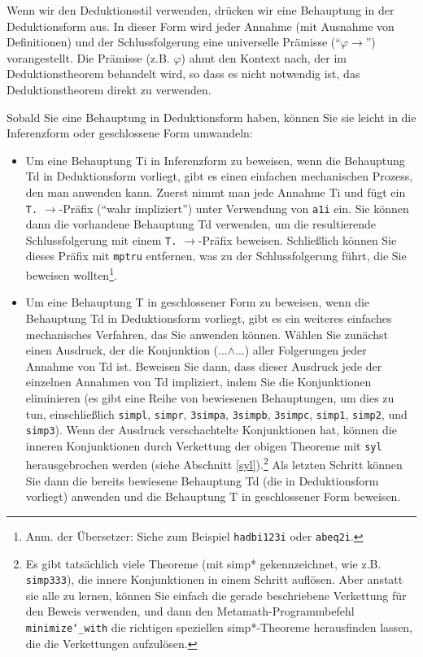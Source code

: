 Wenn wir den Deduktionsstil verwenden, drücken wir eine Behauptung in der Deduktionsform aus. In dieser Form wird jeder Annahme (mit Ausnahme von Definitionen) und der Schlussfolgerung eine universelle Prämisse ("`$\varphi \rightarrow$"') vorangestellt. Die Prämisse (z.B. $\varphi$) ahmt den Kontext nach, der im Deduktionstheorem behandelt wird, so dass es nicht notwendig ist, das Deduktionstheorem direkt zu verwenden.

Sobald Sie eine Behauptung in Deduktionsform haben, können Sie sie leicht in die Inferenzform oder geschlossene Form umwandeln:

\begin{itemize}
\item Um eine Behauptung Ti in Inferenzform zu beweisen, wenn die Behauptung Td in Deduktionsform vorliegt, gibt es einen einfachen mechanischen Prozess, den man anwenden kann. Zuerst nimmt man jede Annahme Ti und fügt ein \texttt{T.} $\rightarrow$-Präfix ("`wahr impliziert"') unter Verwendung von \texttt{a1i} ein. Sie können dann die vorhandene Behauptung Td verwenden, um die resultierende Schlussfolgerung mit einem \texttt{T.} $\rightarrow$-Präfix beweisen. Schließlich können Sie dieses Präfix mit \texttt{mptru} entfernen, was zu der Schlussfolgerung führt, die Sie beweisen wollten\footnote{Anm. der Übersetzer: Siehe zum Beispiel \texttt{hadbi123i} oder \texttt{abeq2i}.}.
\item Um eine Behauptung T in geschlossener Form zu beweisen, wenn die Behauptung Td in Deduktionsform vorliegt, gibt es ein weiteres einfaches mechanisches Verfahren, das Sie anwenden können. Wählen Sie zunächst einen Ausdruck, der die Konjunktion (...$\land$...) aller Folgerungen jeder Annahme von Td ist. Beweisen Sie dann, dass dieser Ausdruck jede der einzelnen Annahmen von Td impliziert, indem Sie die Konjunktionen eliminieren (es gibt eine Reihe von bewiesenen Behauptungen, um dies zu tun, einschließlich
\texttt{simpl},
\texttt{simpr},
\texttt{3simpa},
\texttt{3simpb},
\texttt{3simpc},
\texttt{simp1},
\texttt{simp2},
und
\texttt{simp3}).
Wenn der Ausdruck verschachtelte Konjunktionen hat, können die inneren Konjunktionen durch Verkettung der obigen Theoreme mit \texttt{syl} herausgebrochen werden (siehe Abschnitt \ref{syl}).\footnote{Es gibt tatsächlich viele Theoreme (mit simp* gekennzeichnet, wie z.B. \texttt{simp333}), die innere Konjunktionen in einem Schritt auflösen. Aber anstatt sie alle zu lernen, können Sie einfach die gerade beschriebene Verkettung für den Beweis verwenden, und dann den Metamath-Programmbefehl \texttt{minimize{\char`\_}with} die richtigen speziellen simp*-Theoreme herausfinden lassen, die die Verkettungen aufzulösen.} Als letzten Schritt können Sie dann die bereits bewiesene Behauptung Td (die in Deduktionsform vorliegt) anwenden und die Behauptung T in geschlossener Form beweisen.
\end{itemize}

